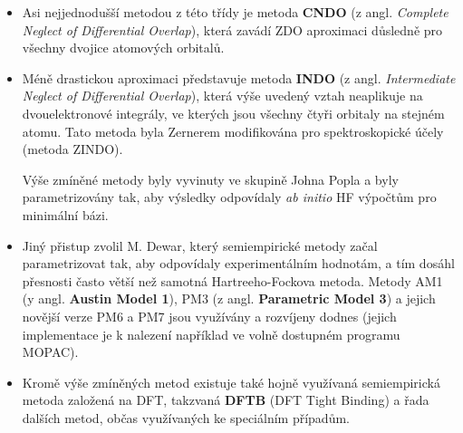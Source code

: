 \begin{itemize}
\item Asi nejjednodušší metodou z této třídy je metoda \textbf{CNDO} (z angl. \textit{Complete Neglect of Differential Overlap}), která zavádí ZDO aproximaci důsledně pro všechny dvojice atomových orbitalů.

\item Méně drastickou aproximaci představuje metoda \textbf{INDO} (z angl. \textit{Intermediate Neglect of Differential Overlap}), která výše uvedený vztah neaplikuje na dvouelektronové integrály, ve kterých jsou všechny čtyři orbitaly na stejném atomu. Tato metoda byla Zernerem modifikována pro spektroskopické účely (metoda ZINDO).

Výše zmíněné metody byly vyvinuty ve skupině Johna Popla a byly parametrizovány tak, aby výsledky odpovídaly \textit{ab initio} HF výpočtům pro minimální bázi. 

\item Jiný přistup zvolil M. Dewar, který semiempirické metody začal parametrizovat tak, aby odpovídaly experimentálním hodnotám, a tím dosáhl přesnosti často větší než samotná Hartreeho-Fockova metoda. Metody AM1 (y angl. \textbf{Austin Model 1}), PM3 (z angl. \textbf{Parametric Model 3}) a jejich novější verze PM6 a PM7 jsou využívány a rozvíjeny dodnes (jejich implementace je k nalezení například ve volně dostupném programu MOPAC).

\item Kromě výše zmíněných metod existuje také hojně využívaná semiempirická metoda založená na DFT, takzvaná \textbf{DFTB} (DFT Tight Binding) a řada dalších metod, občas využívaných ke speciálním případům.

\end{itemize}
 



 
